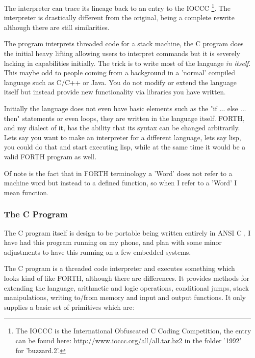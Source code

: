 \documentclass	[a4paper, 10pt]	{article}
\begin{document}
    The interpreter can trace its lineage back to an entry to the IOCCC \footnote{
    The IOCCC is the International Obfuscated C Coding Competition, the entry can
    be found here: \url{http://www.ioccc.org/all/all.tar.bz2} in the folder '1992'
    for 'buzzard.2'.}. The interpreter is drastically different from the original,
    being a complete rewrite although there are still similarities. 

    The program interprets threaded code \cite{threadedCode} for a stack machine,
    the C program does the initial heavy lifting allowing users to interpret commands
    but it is severely lacking in capabilities initially. The trick is to write most
    of the language \emph{in itself}. This maybe odd to people coming from a background
    in a 'normal' compiled language such as C/C++ or Java. You do not modify or extend
    the language itself but instead provide new functionality via libraries you have
    written.

    Initially the language does not even have basic elements such as the "if ... else ... then"
    statements or even loops, they are written in the language itself. FORTH, and my
    dialect of it, has the ability that its syntax can be changed arbitrarily. Lets say
    you want to make an interpreter for a different language, lets say lisp, you could
    do that and start executing lisp, while at the same time it would be a valid FORTH
    program as well.

    Of note is the fact that in FORTH terminology a 'Word' does not refer to a machine
    word but instead to a defined function, so when I refer to a 'Word' I mean function.

      \subsubsection{The C Program}

      The C program itself is design to be portable being written entirely in ANSI C \cite{ANSIC}, 
      I have had this program running on my phone, and plan with some minor adjustments
      to have this running on a few embedded systems.

      The C program is a threaded code interpreter and executes something which looks
      kind of like FORTH, although there are differences. It provides methods for
      extending the language, arithmetic and logic operations, conditional jumps,
      stack manipulations, writing to/from memory and input and output functions. It
      only supplies a basic set of primitives which are:
\end{document}
